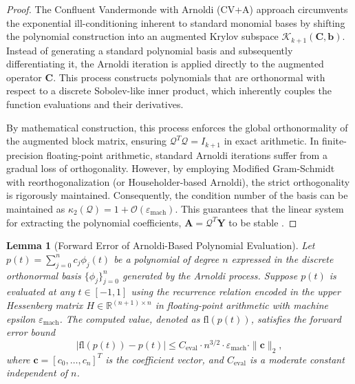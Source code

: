 \documentclass[11pt]{article}
\newtheorem{lemma}{Lemma}
\begin{document}
\begin{proof}
The Confluent Vandermonde with Arnoldi (CV+A) approach circumvents the exponential ill-conditioning inherent to standard monomial bases by shifting the polynomial construction into an augmented Krylov subspace $\mathcal{K}_{k+1}(\mathbf{C}, \mathbf{b})$. 
Instead of generating a standard polynomial basis and subsequently differentiating it, the Arnoldi iteration is applied directly to the augmented operator $\mathbf{C}$. This process constructs polynomials that are orthonormal with respect to a discrete Sobolev-like inner product, which inherently couples the function evaluations and their derivatives. 

By mathematical construction, this process enforces the global orthonormality of the augmented block matrix, ensuring $\mathcal{Q}^T \mathcal{Q} = I_{k+1}$ in exact arithmetic. In finite-precision floating-point arithmetic, standard Arnoldi iterations suffer from a gradual loss of orthogonality. However, by employing Modified Gram-Schmidt with reorthogonalization (or Householder-based Arnoldi), the strict orthogonality is rigorously maintained. Consequently, the condition number of the basis can be maintained as $\kappa_2(\mathcal{Q}) = 1 + \mathcal{O}(\varepsilon_{\text{mach}})$\cite{paige2006mgs}. This guarantees that the linear system for extracting the polynomial coefficients, $\mathbf{A} = \mathcal{Q}^T \mathbf{Y}$ to be stable \cite{Zhang2024ArnoldiFitting}.
\end{proof}


\begin{lemma}[Forward Error of Arnoldi-Based Polynomial Evaluation] \label{lem:eval_error}
Let $p(t) = \sum_{j=0}^{n} c_j \phi_j(t)$ be a polynomial of degree $n$ expressed in the discrete orthonormal basis $\{\phi_j\}_{j=0}^n$ generated by the Arnoldi process. Suppose $p(t)$ is evaluated at any $t \in [-1, 1]$ using the recurrence relation encoded in the upper Hessenberg matrix $H \in \mathbb{R}^{(n+1) \times n}$ in floating-point arithmetic with machine epsilon $\varepsilon_{\text{mach}}$. The computed value, denoted as $\text{fl}(p(t))$, satisfies the forward error bound
\begin{equation}
|\text{fl}(p(t)) - p(t)| \leq C_{\text{eval}} \cdot n^{3/2} \cdot \varepsilon_{\text{mach}} \cdot \|\mathbf{c}\|_2,
\end{equation}
where $\mathbf{c} = [c_0, \dots, c_n]^T$ is the coefficient vector, and $C_{\text{eval}}$ is a moderate constant independent of $n$.
\end{lemma}
\end{document}

